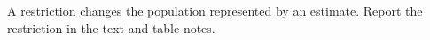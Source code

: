 \documentclass{article}
\begin{document}
\begin{tcolorbox}[title={Check the sample},colback=teal!5,colframe=teal!60!black,breakable]
A restriction changes the population represented by an estimate. Report the restriction in the text and table notes.
\end{tcolorbox}
\end{document}
